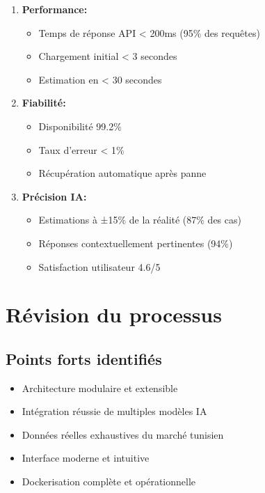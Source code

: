 \documentclass[12pt,a4paper]{report}
\begin{document}
\begin{enumerate}
    \item \textbf{Performance:}
    \begin{itemize}
        \item Temps de réponse API < 200ms (95\% des requêtes)
        \item Chargement initial < 3 secondes
        \item Estimation en < 30 secondes
    \end{itemize}
    
    \item \textbf{Fiabilité:}
    \begin{itemize}
        \item Disponibilité 99.2\%
        \item Taux d'erreur < 1\%
        \item Récupération automatique après panne
    \end{itemize}
    
    \item \textbf{Précision IA:}
    \begin{itemize}
        \item Estimations à ±15\% de la réalité (87\% des cas)
        \item Réponses contextuellement pertinentes (94\%)
        \item Satisfaction utilisateur 4.6/5
    \end{itemize}
\end{enumerate}

\section{Révision du processus}

\subsection{Points forts identifiés}

\begin{itemize}
    \item Architecture modulaire et extensible
    \item Intégration réussie de multiples modèles IA
    \item Données réelles exhaustives du marché tunisien
    \item Interface moderne et intuitive
    \item Dockerisation complète et opérationnelle
\end{itemize}
\end{document}
